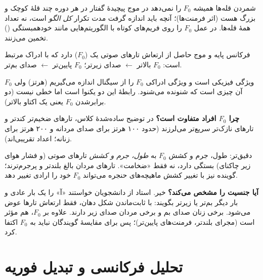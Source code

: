 
\begin{correctionbox}{شمردن قله‌ها همیشه $F_0$ را نمی‌دهد}
در موج پیچیدهٔ گفتار در هر دوره چند قلهٔ کوچک و بزرگ هست (اثر فرمنت‌ها)؛ آنچه باید اندازه گرفت مدت تکرار \emph{کل الگو} است، نه تعداد همهٔ قله‌ها. در عمل $F_0$ را روی فریم‌های کوتاه با الگوریتم‌هایی مانند خودهمبستگی () تخمین می‌زنند.
\end{correctionbox}

\begin{definitionbox}{فرکانس پایه و }
موج حاصل از ارتعاش تارهای صوتی یک  ($F_0$) دارد که با ادراک  مرتبط است: $F_0$ بالاتر $\leftarrow$ صدای زیرتر؛ $F_0$ پایین‌تر $\leftarrow$ صدای بم‌تر.
\end{definitionbox}

\begin{correctionbox}{$F_0$ ویژگی فیزیکی است و  ویژگی ادراکی}
$F_0$ را از سیگنال اندازه می‌گیریم (هرتز) ولی  آن چیزی است که شنونده می‌شنود. رابطهٔ این دو یکنوا است اما خطی نیست (دو برابرشدن $F_0$ یعنی یک اکتاو بالاتر).
\end{correctionbox}

\textbf{چرا $F_0$ افراد متفاوت است؟} در توضیح ساده‌شدهٔ کلاس، تارهای ضخیم‌تر کندتر و تارهای نازک‌تر سریع‌تر می‌لرزند (حدود ۱۰۰ هرتز برای صدای مردانه و ۲۰۰ هرتز برای زنانه؛ اعداد تقریبی‌اند).
\begin{correctionbox}{دقیق‌تر: طول، جرم و کشش}
$F_0$ به \emph{طول، جرم و کشش} تارهای صوتی (و فشار هوای زیر چاکنای) بستگی دارد، نه فقط «ضخامت». تارهای مردان بالغ بلندتر و پرجرم‌ترند؛ گوینده نیز با تغییر کشش ماهیچه‌های حنجره می‌تواند $F_0$ خود را ارادی تغییر دهد.
\end{correctionbox}

\textbf{آیا  جنسیت را مشخص می‌کند؟} خیر. استاد از دانشجویان خواستند «آ» را یک بار عادی و بار دیگر بم‌تر یا زیرتر بگویند: با ثابت‌ماندن شکل دهان، فقط ارتعاش تارها عوض می‌شود. برخی زنان صدای بم و برخی مردان صدای زیر دارند. علاوه بر $F_0$،  هم مؤثر است (مجرای بلندتر، فرمنت‌های پایین‌تر)؛ پس برای مقایسهٔ گویندگان نباید به $F_0$ اکتفا کرد.

\section{تحلیل فرکانسی و تبدیل فوریه}

